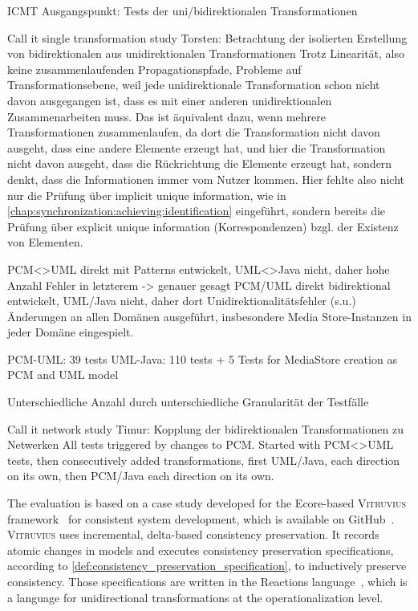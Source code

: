 \begin{copiedFrom}{ICMT}
Ausgangspunkt: Tests der uni/bidirektionalen Transformationen

Call it single transformation study
Torsten: Betrachtung der isolierten Erstellung von bidirektionalen aus unidirektionalen Transformationen
Trotz Linearität, also keine zusammenlaufenden Propagationspfade, Probleme auf Transformationsebene, weil jede unidirektionale Transformation schon nicht davon ausgegangen ist, dass es mit einer anderen unidirektionalen Zusammenarbeiten muss.
Das ist äquivalent dazu, wenn mehrere Transformationen zusammenlaufen, da dort die Transformation nicht davon ausgeht, dass eine andere Elemente erzeugt hat, und hier die Transformation nicht davon ausgeht, dass die Rückrichtung die Elemente erzeugt hat, sondern denkt, dass die Informationen immer vom Nutzer kommen.
Hier fehlte also nicht nur die Prüfung über implicit unique information, wie in \autoref{chap:synchronization:achieving:identification} eingeführt, sondern bereits die Prüfung über explicit unique information (Korrespondenzen) bzgl. der Existenz von Elementen.

PCM<>UML direkt mit Patterns entwickelt, UML<>Java nicht, daher hohe Anzahl Fehler in letzterem -> genauer gesagt PCM/UML direkt bidirektional entwickelt, UML/Java nicht, daher dort Unidirektionalitätsfehler (s.u.)
Änderungen an allen Domänen ausgeführt, insbesondere Media Store-Instanzen in jeder Domäne eingespielt.

PCM-UML: 39 tests
UML-Java: 110 tests
+ 5 Tests for MediaStore creation as PCM and UML model

Unterschiedliche Anzahl durch unterschiedliche Granularität der Testfälle


Call it network study
Timur: Kopplung der bidirektionalen Transformationen zu Netwerken
All tests triggered by changes to PCM.
Started with PCM<>UML tests, then consecutively added transformations, first UML/Java, each direction on its own, then PCM/Java each direction on its own.


The evaluation is based on a case study developed for the Ecore-based \textsc{Vitruvius} framework~\cite{kramer2013b} for consistent system development, which is available on GitHub~\cite{vitruvFrameworkGithub}.
\textsc{Vitruvius} uses incremental, delta-based consistency preservation. 
It records atomic changes in models and executes consistency preservation specifications, according to \autoref{def:consistency_preservation_specification}, to inductively preserve consistency.
Those specifications are written in the Reactions language~\cite{klare2016b}, which is a language for unidirectional transformations at the operationalization level.


\end{copiedFrom}
